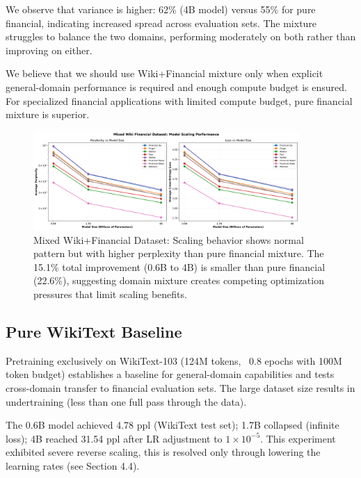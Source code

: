 We observe that variance is higher: 62\% (4B model) versus 55\% for pure financial, indicating increased spread across evaluation sets. The mixture struggles to balance the two domains, performing moderately on both rather than improving on either.

We believe that we should use Wiki+Financial mixture only when explicit general-domain performance is required and enough compute budget is ensured. For specialized financial applications with limited compute budget, pure financial mixture is superior.

\begin{figure}[htbp]
\centering
\includegraphics[width=0.9\textwidth]{figures/scaling_mixed_wiki_financial.png}
\caption[Mixed Wiki+Financial Dataset: Scaling Behavior]{Mixed Wiki+Financial Dataset: Scaling behavior shows normal pattern but with higher perplexity than pure financial mixture. The 15.1\% total improvement (0.6B to 4B) is smaller than pure financial (22.6\%), suggesting domain mixture creates competing optimization pressures that limit scaling benefits.}
\label{fig:scaling_mixed_wiki_financial}
\end{figure}



\subsection{Pure WikiText Baseline}

Pretraining exclusively on WikiText-103 (124M tokens, ~0.8 epochs with 100M token budget) establishes a baseline for general-domain capabilities and tests cross-domain transfer to financial evaluation sets. The large dataset size results in undertraining (less than one full pass through the data).

The 0.6B model achieved 4.78 ppl (WikiText test set); 1.7B collapsed (infinite loss); 4B reached 31.54 ppl after LR adjustment to $1\times10^{-5}$. This experiment exhibited severe reverse scaling, this is resolved only through lowering the learning rates (see Section 4.4).

